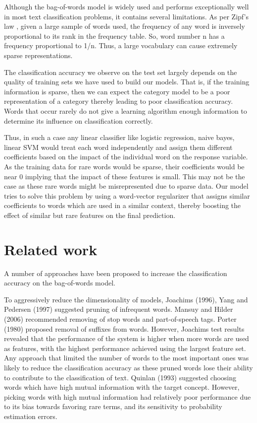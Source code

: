 Although the bag-of-words model is widely used and performs exceptionally well in most text classification problems, it contains several limitations. As per Zipf's law \cite{li1992random}, given a large sample of words used, the frequency of any word is inversely proportional to its rank in the frequency table. So, word number n has a frequency proportional to 1/n. Thus, a large vocabulary can cause extremely sparse representations. 

The classification accuracy we observe on the test set largely depends on the quality of training sets we have used to build our models. That is, if the training information is sparse, then we can expect the category model to be a poor representation of a category thereby leading to poor classification accuracy. Words that occur rarely do not give a learning algorithm enough information to determine its influence on classification correctly.

Thus, in such a case any linear classifier like logistic regression, naive bayes, linear SVM would treat each word independently and assign them different coefficients based on the impact of the individual word on the response variable. As the training data for rare words would be sparse, their coefficients would be near 0 implying that the impact of these features is small. This may not be the case as these rare words might be misrepresented due to sparse data. Our model tries to solve this problem by using a word-vector regularizer that assigns similar coefficients to words which are used in a similar context, thereby boosting the effect of similar but rare features on the final prediction.

\chapter{Related work}

A number of approaches have been proposed to increase the classification accuracy on the bag-of-words model.

To aggressively reduce the dimensionality of models, Joachims \cite{joachims1996probabilistic} (1996), Yang and Pedersen\cite{yang1997comparative} (1997) suggested pruning of infrequent words. Mansuy and Hilder \cite{mansuy2006characterization} (2006) recommended removing of stop words and part-of-speech tags. Porter \cite{porter1980algorithm} (1980) proposed removal of suffixes from words. However, Joachims \cite{joachims1996probabilistic} test results revealed that the performance of the system is higher when more words are used as features, with the highest performance achieved using the largest feature set. Any approach that limited the number of words to the most important ones was likely to reduce the classification accuracy as these pruned words lose their ability to contribute to the classification of text. Quinlan \cite{quinlan2014c4} (1993) suggested choosing words which have high mutual information with the target concept. However, picking words with high mutual information had relatively poor performance due to its bias towards favoring rare terms, and its sensitivity to probability estimation errors.

